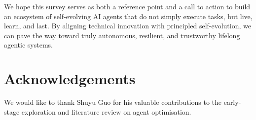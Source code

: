 \documentclass[]{selfevolagent}
\theoremstyle{plain}
\theoremstyle{definition}
\theoremstyle{remark}
\begin{document}
We hope this survey serves as both a reference point and a call to action to build an ecosystem of self-evolving AI agents that do not simply execute tasks, but live, learn, and last. By aligning technical innovation with principled self-evolution, we can pave the way toward truly autonomous, resilient, and trustworthy lifelong agentic systems.

\section*{Acknowledgements} 
We would like to thank Shuyu Guo for his valuable contributions to the early-stage exploration and literature review on agent optimisation.



\clearpage
% 
\end{document}
